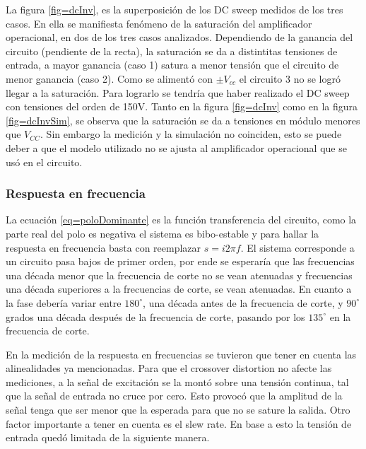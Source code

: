\documentclass[../../main.tex]{subfiles}
\begin{document}
La figura \ref{fig=dcInv}, es la superposición de los DC sweep medidos de los tres casos. En ella se manifiesta fenómeno de la saturación del amplificador operacional, en dos de los tres casos analizados. Dependiendo de la ganancia del circuito (pendiente de la recta), la saturación se da a distintitas tensiones de entrada, a mayor ganancia (caso 1) satura a menor tensión que el circuito de menor ganancia (caso 2). Como se alimentó con $\pm V_{cc}$ el circuito 3 no se logró llegar a la saturación. Para lograrlo se tendría que haber realizado el DC sweep con tensiones del orden de 150V.
Tanto en la figura \ref{fig=dcInv} como en la figura \ref{fig=dcInvSim},  se observa que la saturación se da a tensiones en módulo menores que $V_{CC}$. Sin embargo la medición y la simulación no coinciden, esto se puede deber a que el modelo utilizado no se ajusta al amplificador operacional que se usó en el circuito.

\subsubsection{Respuesta en frecuencia}

La ecuación \ref{eq=poloDominante} es la función transferencia del circuito, como la parte real del polo es negativa el sistema es bibo-estable y para hallar la respuesta en frecuencia basta con reemplazar $s=i2\pi f$. El sistema corresponde a un circuito pasa bajos de primer orden, por ende se esperaría que las frecuencias una década menor que la frecuencia de corte no se vean atenuadas y frecuencias una década superiores a la frecuencias de corte, se vean atenuadas. En cuanto a la fase debería variar entre $180^{\circ}$, una década antes de la frecuencia de corte, y $90^{\circ}$ grados una década después de la frecuencia de corte, pasando por los $135^{\circ}$ en la frecuencia de corte.\par

En la medición de la respuesta en frecuencias se tuvieron que tener en cuenta las alinealidades ya mencionadas. Para que el crossover distortion no afecte las mediciones, a la señal de excitación se la mont\'o sobre una tensión continua, tal que la señal de entrada no cruce por cero. Esto provocó que la amplitud de la señal tenga que ser menor que la esperada para que no se sature la salida. Otro factor importante a tener en cuenta es el slew rate. En base a esto la tensión de entrada qued\'o limitada de la siguiente manera.
\end{document}

